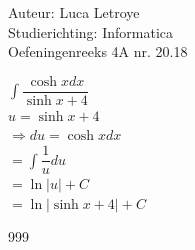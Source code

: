 \documentclass[a4paper]{article}
\begin{document}
  
\noindent \large Auteur: Luca Letroye \\
\noindent \large Studierichting: Informatica\\
\noindent \large Oefeningenreeks 4A nr. 20.18\\

\medskip
\normalsize

$\displaystyle\int \dfrac{\cosh x dx}{\sinh x +4}$\\

$u = \sinh x +4$\\

$ \Rightarrow du = \cosh x dx$\\

$ = \displaystyle\int \dfrac{1}{u}du$\\

$ = \ln|u| +C$\\

$ = \ln|\sinh x +4| +C$\\




\begin{thebibliography}{999}
\end{thebibliography}
\end{document}
